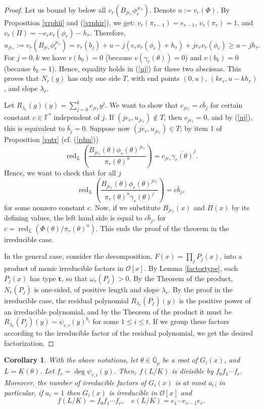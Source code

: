 \documentclass{amsart}
\newtheorem{corollary}[theorem]{Corollary}
\def\op{\operatorname}
\def\dg{\op{deg}}
\def\ff#1{\mathbb{F}_{#1}}
\def\ga{\gamma}
\def\gb#1{\overline{\gamma_{#1}(\t)}}
\def\la{\lambda}
\def\om{\omega}
\def\oo{{\mathcal O}}
\def\qpb{\overline{\mathbb{Q}}_p}
\def\rd{\op{red}}
\def\rdm{\rd_{L}}
\def\t{\theta}
\def\ty{\mathbf{t}}
\def\zpx{\oo[x]}
\begin{document}
\begin{proof}
Let us bound by below all $v_r(B_{je_r}\phi_r^{je_r})$. Denote $u:=v_r(\Phi)$. By Proposition \ref{vrphii} and (\ref{vrphir}), we get: $v_r(\pi_{r-1})=e_{r-1}$, $v_r(\pi_r)=1$, and  $v_r(\Pi)=-e_rv_r(\phi_r)-h_r$. Therefore,
\begin{equation}\label{uj}
u_{je_r}:=v_r(B_{je_r}\phi_r^{je_r})=v_r(b_j)+u-j(e_rv_r(\phi_r)+h_r)+je_rv_r(\phi_r)\ge u-jh_r.
\end{equation}
For $j=0,k$ we have $v(b_0)=0$ (because $v(\ga_r(\t))=0$) and $v(b_k)=0$ (because $b_k=1$). Hence, equality holds in (\ref{uj}) for these two abscissas. This proves that $N_r(g)$ has only one side $T$, with end points $(0,u)$, $(ke_r,u-kh_r)$, and slope $\la_r$.

Let $R_{\la_r}(g)(y)=\sum_{j=0}^kc_{je_r}y^j$. We want to show that $c_{je_r}=c\bar{b}_j$ for certain constant $c\in\ff{}^*$ independent of $j$. If $(je_r,u_{je_r})\not \in T$, then $c_{je_r}=0$, and by (\ref{uj}), this is equivalent to $\bar{b_j}=0$. Suppose now $(je_r,u_{je_r})\in T$; by item 1 of Proposition \ref{vqtr} (cf. (\ref{rdm})) 
$$
\rdm\left(\dfrac{B_{je_r}(\t)\phi_r(\t)^{je_r}}{\pi_r(\t)^u}\right)= c_{je_r}\gb{r}^j.
$$ Hence, we want to check that for all $j$
$$
\rdm\left(\dfrac{B_{je_r}(\t)\phi_r(\t)^{je_r}}{\pi_r(\t)^u\ga_r(\t)^j}\right)=c\bar{b}_j,
$$for some nonzero constant $c$. Now, if we substitute $B_{je_r}(x)$ and $\Pi(x)$ by its defining values, the left hand side is equal to $c\bar{b}_j$, for $c=\rdm(\Phi(\t)/\pi_r(\t)^u)$. This ends the proof of the theorem in the irreducible case.

In the general case, consider the decomposition, $F(x)=\prod_jP_j(x)$, into a product of monic irreducible factors in $\zpx$. By Lemma \ref{factortype}, each $P_j(x)$ has type $\ty$, so that $\om_r(P_j)>0$. By the Theorem of the product, $N_r(P_j)$ is one-sided, of positive length and slope $\la_r$. By the proof in the irreducible case, the residual polynomial $R_{\la_r}(P_j)(y)$ is the positive power of an irreducible polynomial, and by the Theorem of the product it must be $R_{\la_r}(P_j)(y)\sim\psi_{r,i}(y)^{b_j}$ for some $1\le i\le t$. If we group these factors according to the irreducible factor of the residual polynomial, we get the desired factorization.
\end{proof}

\begin{corollary}\label{ramr}
With the above notations, let $\t\in\qpb$ be a root of $G_i(x)$, and $L=K(\t)$. Let $f_r=\dg \psi_{r,i}(y)$. Then, $f(L/K)$ is divisible by $f_0f_1\cdots f_r$. Moreover, the number of irreducible factors of $G_i(x)$ is at most $a_i$; in particular, if $a_i=1$ then $G_i(x)$ is irreducible in $\zpx$ and 
$$f(L/K)=f_0f_1\cdots f_r,\quad e(L/K)=e_1\cdots e_{r-1}e_r.
$$
\end{corollary}
\end{document}
